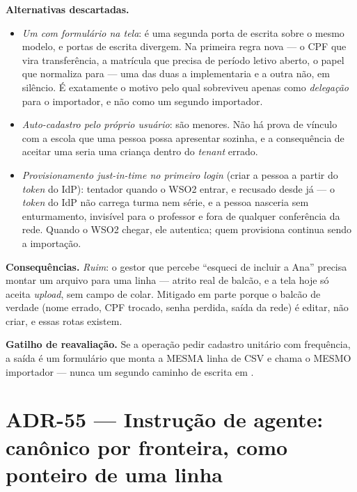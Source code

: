 \textbf{Alternativas descartadas.}
\begin{itemize}
  \item \emph{Um  com formulário na tela}: é uma segunda
    porta de escrita sobre o mesmo modelo, e portas de escrita divergem. Na
    primeira regra nova --- o CPF que vira transferência, a matrícula que
    precisa de período letivo aberto, o papel  que normaliza
    para  --- uma das duas a implementaria e a outra não, em
    silêncio. É exatamente o motivo pelo qual 
    sobreviveu apenas como \emph{delegação} para o importador, e não como um
    segundo importador.
  \item \emph{Auto-cadastro pelo próprio usuário}: são menores. Não há prova de
    vínculo com a escola que uma pessoa possa apresentar sozinha, e a
    consequência de aceitar uma seria uma criança dentro do \emph{tenant}
    errado.
  \item \emph{Provisionamento \emph{just-in-time} no primeiro login} (criar a
    pessoa a partir do \emph{token} do IdP): tentador quando o WSO2 entrar, e
    recusado desde já --- o \emph{token} do IdP não carrega turma nem série, e a
    pessoa nasceria sem enturmamento, invisível para o professor e fora de
    qualquer conferência da rede. Quando o WSO2 chegar, ele autentica; quem
    provisiona continua sendo a importação.
\end{itemize}

\textbf{Consequências.} \emph{Ruim}: o gestor que percebe \enquote{esqueci de
incluir a Ana} precisa montar um arquivo para uma linha --- atrito real de
balcão, e a tela hoje só aceita \emph{upload}, sem campo de colar. Mitigado em
parte porque o balcão de verdade (nome errado, CPF trocado, senha perdida,
saída da rede) é editar, não criar, e essas rotas existem.

\textbf{Gatilho de reavaliação.} Se a operação pedir cadastro unitário com
frequência, a saída é um formulário que monta a MESMA linha de CSV e chama o
MESMO importador --- nunca um segundo caminho de escrita em .

\section{ADR-55 --- Instrução de agente:  canônico por fronteira,
 como ponteiro de uma linha}
\label{adr:instrucao-de-agente}

